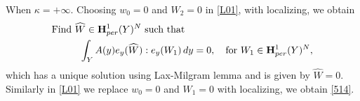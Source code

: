 \documentclass[11pt,a4paper]{article}
\numberwithin{equation}{section}
\def\O{\Omega}
\def\Ge{{\bf e}}
\def\Mc{{\mathcal{M}}}
\def\wh{\widehat }
\def\X{\times }
\def\Ge{{\bf e}}
\def\Gu{{\bf u}}
\def\GH{{\bf H}}
\begin{document}
When $\kappa=+\infty$. Choosing $w_0=0$ and $W_2=0$ in \eqref{L01}, with localizing, we obtain 
\begin{equation}\label{5172}
	\begin{aligned}
		&\text{Find $\wh W\in \GH^1_{per}(Y)^N$ such that}\\
		&\hskip 10mm \int_{Y} A(y)e_y(\wh W): e_y(W_1)\,dy=0,\quad\text{for $W_1\in \GH^1_{per}(Y)^N$},
	\end{aligned}
\end{equation}
which has a unique solution using Lax-Milgram lemma and is given by $\wh W=0$. Similarly in \eqref{L01} we replace $w_0=0$ and $W_1=0$ with localizing, we obtain \eqref{514}.
\end{document}
